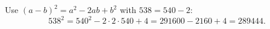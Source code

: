 Use $(a-b)^2=a^2-2ab+b^2$ with $538=540-2$:
\[
538^2=540^2-2\cdot2\cdot540+4=291600-2160+4=\boxed{289444}.
\]

